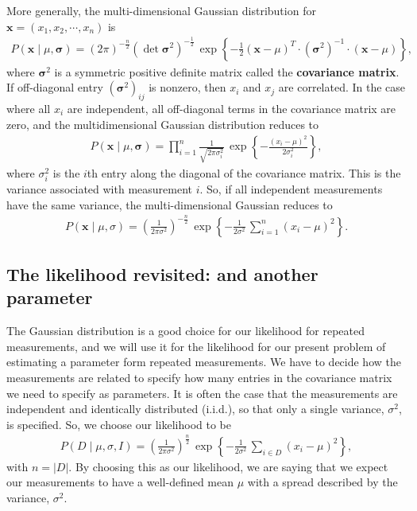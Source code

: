 More generally, the multi-dimensional Gaussian distribution for
$\mathbf{x} = (x_1, x_2, \cdots, x_n)$ is
\begin{align}
  P(\mathbf{x} \mid \mu, \boldsymbol{\sigma}) = (2\pi)^{-\frac{n}{2}} \left(\det \boldsymbol{\sigma}^2\right)^{-\frac{1}{2}}\,
  \exp\left\{-\frac{1}{2}(\mathbf{x} - \mu)^T\cdot (\boldsymbol{\sigma}^2)^{-1}\cdot(\mathbf{x} - \mu)\right\},
\end{align}
where $\boldsymbol{\sigma}^2$ is a symmetric positive definite matrix
called the \textbf{covariance matrix}.  If off-diagonal entry
$(\boldsymbol{\sigma}^2)_{ij}$ is nonzero, then $x_i$ and $x_j$ are
correlated.  In the case where all $x_i$ are independent, all
off-diagonal terms in the covariance matrix are zero, and the
multidimensional Gaussian distribution reduces to
\begin{align}
  P(\mathbf{x} \mid \mu, \boldsymbol{\sigma}) = \prod_{i=1}^n \frac{1}{\sqrt{2\pi \sigma_i^2}}\,
  \exp\left\{-\frac{(x_i - \mu)^2}{2\sigma_i^2}\right\},
\end{align}
where $\sigma^2_i$ is the $i$th entry along the diagonal of the
covariance matrix.  This is the variance associated with measurement
$i$.  So, if all independent measurements have the same variance, the
multi-dimensional Gaussian reduces to
\begin{align}
P(\mathbf{x} \mid \mu, \sigma) = \left(\frac{1}{2\pi \sigma^2} \right)^{-\frac{n}{2}}\,
  \exp\left\{-\frac{1}{2\sigma^2}\,\sum_{i=1}^n (x_i - \mu)^2\right\}.
\end{align}



\subsection{The likelihood revisited: and another parameter}
The Gaussian distribution is a good choice for our likelihood for
repeated measurements, and we will use it for the likelihood for our
present problem of estimating a parameter form repeated measurements.
We have to decide how the measurements are related to specify how many
entries in the covariance matrix we need to specify as parameters.  It
is often the case that the measurements are independent and identically
distributed (i.i.d.), so that only a single variance, $\sigma^2$, is
specified.  So, we choose our likelihood to be
\begin{align}
  P(D\mid \mu, \sigma, I) = \left(\frac{1}{2\pi \sigma^2} \right)^{\frac{n}{2}}\,
  \exp\left\{-\frac{1}{2\sigma^2}\,\sum_{i\in D} (x_i - \mu)^2\right\},
\end{align}
with $n = |D|$.  By choosing this as our likelihood, we are saying
that we expect our measurements to have a well-defined mean $\mu$ with
a spread described by the variance, $\sigma^2$.

